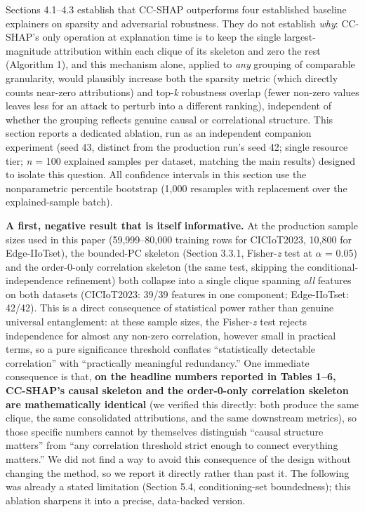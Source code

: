 Sections 4.1--4.3 establish that CC-SHAP outperforms four established baseline explainers on sparsity and adversarial robustness. They do not establish \emph{why}: CC-SHAP's only operation at explanation time is to keep the single largest-magnitude attribution within each clique of its skeleton and zero the rest (Algorithm 1), and this mechanism alone, applied to \emph{any} grouping of comparable granularity, would plausibly increase both the sparsity metric (which directly counts near-zero attributions) and top-\emph{k} robustness overlap (fewer non-zero values leaves less for an attack to perturb into a different ranking), independent of whether the grouping reflects genuine causal or correlational structure. This section reports a dedicated ablation, run as an independent companion experiment (seed 43, distinct from the production run's seed 42; single resource tier; \emph{n} = 100 explained samples per dataset, matching the main results) designed to isolate this question. All confidence intervals in this section use the nonparametric percentile bootstrap \citep{ref48} (1,000 resamples with replacement over the explained-sample batch).

\textbf{A first, negative result that is itself informative.} At the production sample sizes used in this paper (59,999--80,000 training rows for CICIoT2023, 10,800 for Edge-IIoTset), the bounded-PC skeleton (Section 3.3.1, Fisher-\emph{z} test at $\alpha$ = 0.05) and the order-0-only correlation skeleton (the same test, skipping the conditional-independence refinement) both collapse into a single clique spanning \emph{all} features on both datasets (CICIoT2023: 39/39 features in one component; Edge-IIoTset: 42/42). This is a direct consequence of statistical power rather than genuine universal entanglement: at these sample sizes, the Fisher-\emph{z} test rejects independence for almost any non-zero correlation, however small in practical terms, so a pure significance threshold conflates ``statistically detectable correlation'' with ``practically meaningful redundancy.'' One immediate consequence is that, \textbf{on the headline numbers reported in Tables 1--6, CC-SHAP's causal skeleton and the order-0-only correlation skeleton are mathematically identical} (we verified this directly: both produce the same clique, the same consolidated attributions, and the same downstream metrics), so those specific numbers cannot by themselves distinguish ``causal structure matters'' from ``any correlation threshold strict enough to connect everything matters.'' We did not find a way to avoid this consequence of the design without changing the method, so we report it directly rather than past it. The following was already a stated limitation (Section 5.4, conditioning-set boundedness); this ablation sharpens it into a precise, data-backed version.

